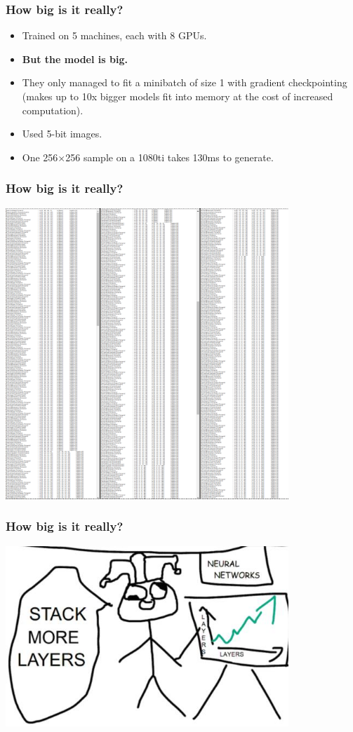 \documentclass{beamer}
\begin{document}
\begin{frame}
  \frametitle{How big is it really?}

  \begin{itemize}
    \item Trained on 5 machines, each with 8 GPUs.
    \item \textbf{But the model is big.}
    \item They only managed to fit a minibatch of size 1 with gradient
      checkpointing (makes up to 10x bigger models fit into memory at the cost
      of increased computation).
    \item Used 5-bit images.

    \item One 256$\times$256 sample on a 1080ti takes 130ms to generate.
  \end{itemize}


\end{frame}

\begin{frame}
  \frametitle{How big is it really?}


  \includegraphics[width=0.8\textwidth]{glow-layers.png}
\end{frame}

\begin{frame}
  \frametitle{How big is it really?}

  \includegraphics[width=0.8\textwidth]{layers-meme.png}
\end{frame}
\end{document}
